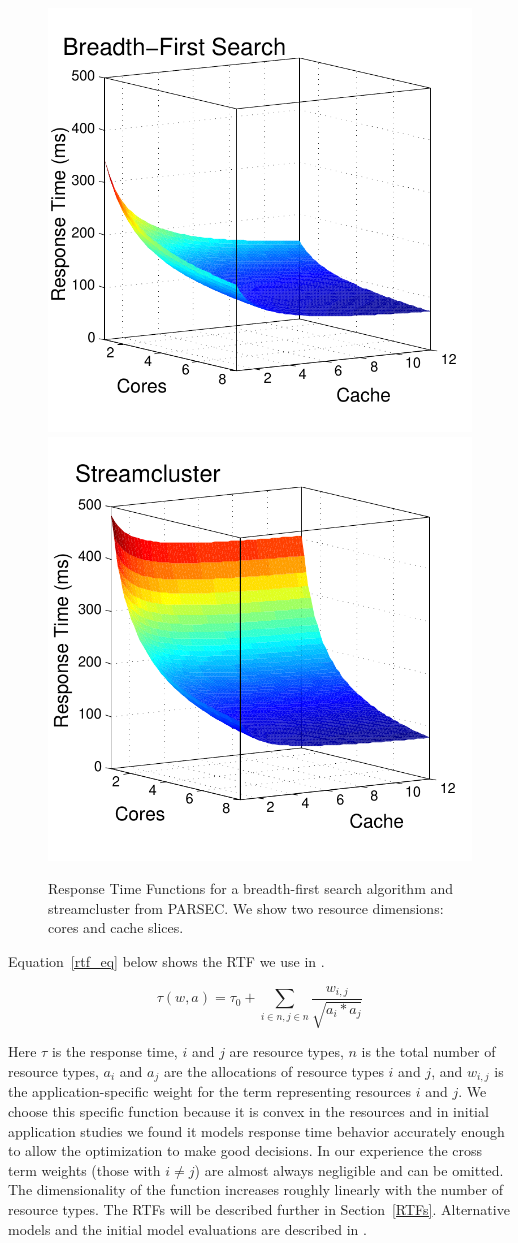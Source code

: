 \begin{figure}[hb]
\includegraphics*[bb=0 0 360 360,width=.49\columnwidth]{Figures/bfs-fig.pdf}
\includegraphics*[bb=0 0 360
  360,width=.49\columnwidth]{Figures/streamcluster-fig.pdf}
\caption{\label{sample_rtf} Response Time Functions for a
  breadth-first search algorithm and streamcluster from PARSEC. We show two resource dimensions: cores and cache slices.}
\end{figure}

Equation~\ref{rtf_eq} below shows the RTF we use in \pacora.

\begin{equation}\label{rtf_eq}
\tau(w,a) = \tau_0 + \sum_{i\in n,j\in n}{\frac{w_{i,j}}{\sqrt{a_i * a_j}}}
\end{equation}

Here $\tau$ is the response time, $i$ and $j$ are
resource types, $n$ is the total number of resource types,
$a_{i}$ and $a_{j}$ are the allocations of resource types $i$
and $j$, and $w_{i,j}$ is the application-specific weight for
the term representing resources $i$ and $j$.
We choose this specific function because it is convex in the resources and in initial application studies
we found it models response time behavior accurately enough to allow the optimization to make good decisions.
In our experience the cross term weights (those with $i\neq j$) are almost always negligible and can be omitted.
The dimensionality of the function increases roughly linearly with the number of resource types.
The RTFs will be described further in Section~\ref{RTFs}.
Alternative models and the initial model evaluations are described in
\cite{pacora_tr}.


